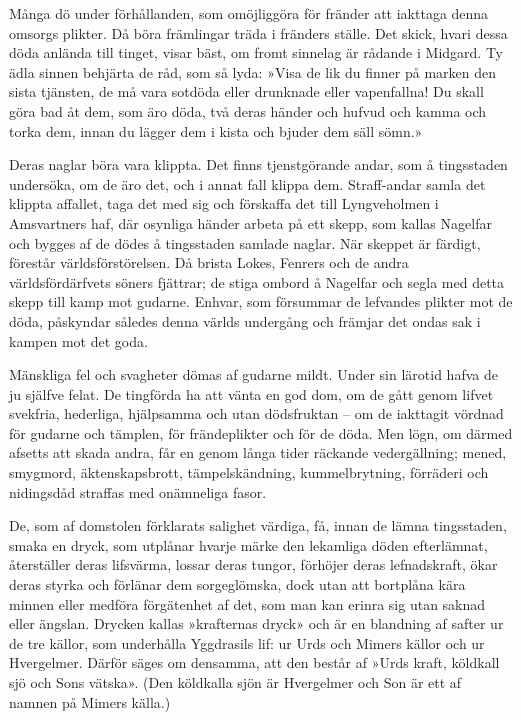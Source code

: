 Många dö under förhållanden, som omöjliggöra för fränder att iakttaga
denna omsorgs plikter. Då böra främlingar träda i fränders ställe. Det
skick, hvari dessa döda anlända till tinget, visar bäst, om fromt
sinnelag är rådande i Midgard. Ty ädla sinnen behjärta de råd, som så
lyda: »Visa
de lik du finner på marken den sista tjänsten, de må vara sotdöda eller
drunknade eller vapenfallna! Du skall göra bad åt dem, som äro döda, två
deras händer och hufvud och kamma och torka dem, innan du lägger dem i
kista och bjuder dem säll sömn.»

Deras naglar böra vara klippta. Det finns tjenstgörande andar, som å
tingsstaden undersöka, om de äro det, och i annat fall klippa dem.
Straff-andar samla det klippta affallet, taga det med sig och förskaffa
det till Lyngveholmen i Amsvartners haf, där osynliga händer arbeta på
ett skepp, som kallas Nagelfar och bygges af de dödes å tingsstaden
samlade naglar. När skeppet är färdigt, förestår världsförstörelsen. Då
brista Lokes, Fenrers och de andra världsfördärfvets söners fjättrar; de
stiga ombord å Nagelfar och segla med detta skepp till kamp mot gudarne.
Enhvar, som försummar de lefvandes plikter mot de döda, påskyndar
således denna världs undergång och främjar det ondas sak i kampen mot
det goda.

Mänskliga fel och svagheter dömas af gudarne mildt. Under sin lärotid
hafva de ju själfve felat. De tingförda ha att vänta en god dom, om de
gått genom lifvet svekfria, hederliga, hjälpsamma och utan dödsfruktan
-- om de iakttagit vördnad för gudarne och tämplen, för frändeplikter
och för de döda. Men lögn, om därmed afsetts att skada andra, får en
genom långa tider räckande vedergällning; mened, smygmord,
äktenskapsbrott, tämpelskändning, kummelbrytning, förräderi och
nidingsdåd straffas med onämneliga fasor.

De, som af domstolen förklarats salighet värdiga, få, innan de lämna
tingsstaden, smaka en dryck, som utplånar hvarje märke den lekamliga
döden efterlämnat, återställer deras lifsvärma, lossar deras tungor,
förhöjer deras lefnadskraft, ökar deras styrka och förlänar dem
sorgeglömska, dock utan att bortplåna kära minnen eller medföra
förgätenhet af det, som man kan erinra sig utan saknad eller ängslan.
Drycken kallas »krafternas dryck» och är en blandning af safter ur de
tre källor, som underhålla Yggdrasils lif: ur Urds och Mimers källor och
ur Hvergelmer. Därför säges om
densamma,
att den består af »Urds kraft, köldkall sjö och Sons vätska». (Den
köldkalla sjön är Hvergelmer och Son är ett af namnen på Mimers källa.)

